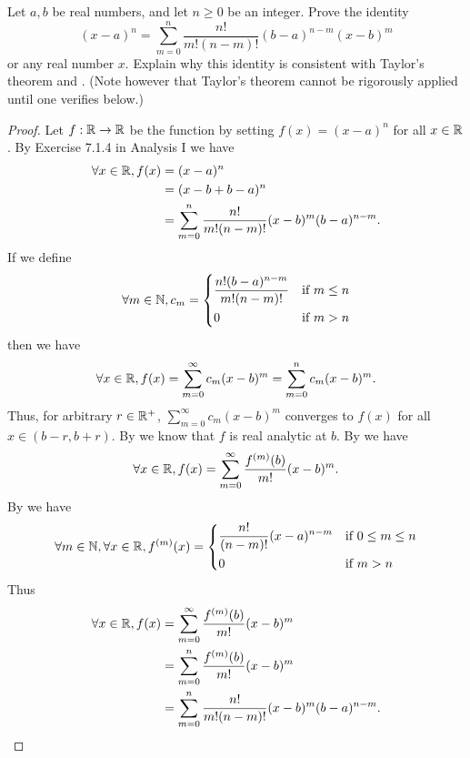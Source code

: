\begin{ex}\label{ii:ex:4.2.5}
  Let \(a, b\) be real numbers, and let \(n \geq 0\) be an integer.
  Prove the identity
  \[
    (x - a)^n = \sum_{m = 0}^n \dfrac{n!}{m! (n - m)!} (b - a)^{n - m} (x - b)^m
  \]
  or any real number \(x\).
  Explain why this identity is consistent with Taylor's theorem and .
  (Note however that Taylor's theorem cannot be rigorously applied until one verifies  below.)
\end{ex}

\begin{proof}
  Let \(f : \mathbb{R} \to \mathbb{R}\) be the function by setting \(f(x) = (x - a)^n\) for all \(x \in \mathbb{R}\).
  By Exercise 7.1.4 in Analysis I we have
  \begin{align*}
    \forall x \in \mathbb{R}, f(x) & = (x - a)^n                                                         \\
                           & = (x - b + b - a)^n                                                 \\
                           & = \sum_{m = 0}^n \dfrac{n!}{m! (n - m)!} (x - b)^m (b - a)^{n - m}.
  \end{align*}
  If we define
  \[
    \forall m \in \mathbb{N}, c_m = \begin{dcases}
      \dfrac{n! (b - a)^{n - m}}{m! (n - m)!} & \text{if } m \leq n \\
      0                                       & \text{if } m > n
    \end{dcases}
  \]
  then we have
  \[
    \forall x \in \mathbb{R}, f(x) = \sum_{m = 0}^\infty c_m (x - b)^m = \sum_{m = 0}^n c_m (x - b)^m.
  \]
  Thus, for arbitrary \(r \in \mathbb{R}^+\), \(\sum_{m = 0}^\infty c_m (x - b)^m\) converges to \(f(x)\) for all \(x \in (b - r, b + r)\).
  By  we know that \(f\) is real analytic at \(b\).
  By  we have
  \begin{align*}
    \forall x \in \mathbb{R}, f(x) = \sum_{m = 0}^\infty \dfrac{f^{(m)}(b)}{m!} (x - b)^m.
  \end{align*}
  By  we have
  \[
    \forall m \in \mathbb{N}, \forall x \in \mathbb{R}, f^{(m)}(x) = \begin{dcases}
      \dfrac{n!}{(n - m)!} (x - a)^{n - m} & \text{if } 0 \leq m \leq n \\
      0                                    & \text{if } m > n
    \end{dcases}
  \]
  Thus
  \begin{align*}
    \forall x \in \mathbb{R}, f(x) & = \sum_{m = 0}^\infty \dfrac{f^{(m)}(b)}{m!} (x - b)^m              \\
                           & = \sum_{m = 0}^n \dfrac{f^{(m)}(b)}{m!} (x - b)^m                   \\
                           & = \sum_{m = 0}^n \dfrac{n!}{m! (n - m)!} (x - b)^m (b - a)^{n - m}.
  \end{align*}
\end{proof}

